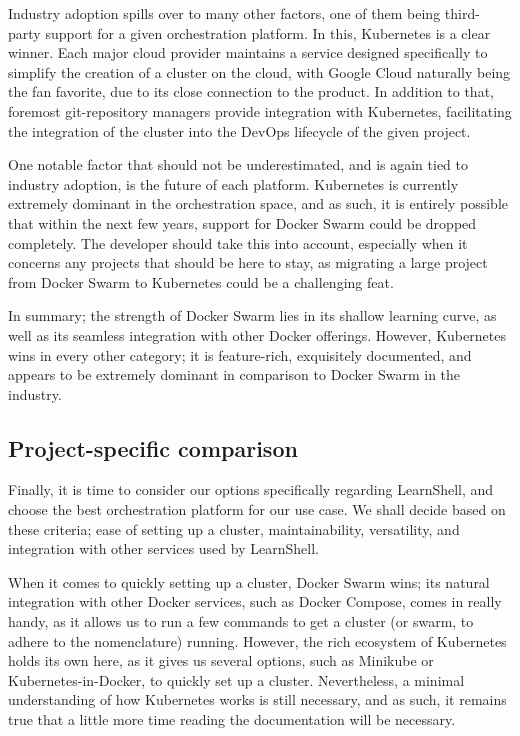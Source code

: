 \documentclass[thesis=B,english]{FITthesis}[2019/12/23]
\begin{document}
Industry adoption spills over to many other factors, one of them being third-party support for a given orchestration platform. In this, Kubernetes is a clear winner. Each major cloud provider maintains a service designed specifically to simplify the creation of a cluster on the cloud, with Google Cloud naturally being the fan favorite, due to its close connection to the product. In addition to that, foremost git-repository managers provide integration with Kubernetes, facilitating the integration of the cluster into the DevOps lifecycle of the given project.

One notable factor that should not be underestimated, and is again tied to industry adoption, is the future of each platform. Kubernetes is currently extremely dominant in the orchestration space, and as such, it is entirely possible that within the next few years, support for Docker Swarm could be dropped completely. The developer should take this into account, especially when it concerns any projects that should be here to stay, as migrating a large project from Docker Swarm to Kubernetes could be a challenging feat.

In summary; the strength of Docker Swarm lies in its shallow learning curve, as well as its seamless integration with other Docker offerings. However, Kubernetes wins in every other category; it is feature-rich, exquisitely documented, and appears to be extremely dominant in comparison to Docker Swarm in the industry.

\subsection{Project-specific comparison}

Finally, it is time to consider our options specifically regarding LearnShell, and choose the best orchestration platform for our use case. We shall decide based on these criteria; ease of setting up a cluster, maintainability, versatility, and integration with other services used by LearnShell.

When it comes to quickly setting up a cluster, Docker Swarm wins; its natural integration with other Docker services, such as Docker Compose, comes in really handy, as it allows us to run a few commands to get a cluster (or swarm, to adhere to the nomenclature) running. However, the rich ecosystem of Kubernetes holds its own here, as it gives us several options, such as Minikube or Kubernetes-in-Docker, to quickly set up a cluster. Nevertheless, a minimal understanding of how Kubernetes works is still necessary, and as such, it remains true that a little more time reading the documentation will be necessary.
\end{document}
